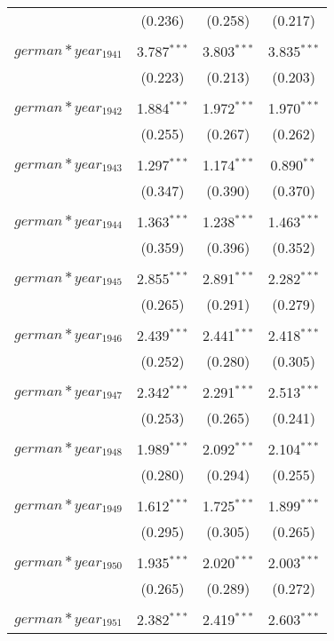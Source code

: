 \begin{table}[!htbp]
\begin{tabular}{@{\extracolsep{5pt}}lccc}
  & (0.236) & (0.258) & (0.217) \\ 
  & & & \\ 
 $german*year_1941$ & 3.787$^{***}$ & 3.803$^{***}$ & 3.835$^{***}$ \\ 
  & (0.223) & (0.213) & (0.203) \\ 
  & & & \\ 
 $german*year_1942$ & 1.884$^{***}$ & 1.972$^{***}$ & 1.970$^{***}$ \\ 
  & (0.255) & (0.267) & (0.262) \\ 
  & & & \\ 
 $german*year_1943$ & 1.297$^{***}$ & 1.174$^{***}$ & 0.890$^{**}$ \\ 
  & (0.347) & (0.390) & (0.370) \\ 
  & & & \\ 
 $german*year_1944$ & 1.363$^{***}$ & 1.238$^{***}$ & 1.463$^{***}$ \\ 
  & (0.359) & (0.396) & (0.352) \\ 
  & & & \\ 
 $german*year_1945$ & 2.855$^{***}$ & 2.891$^{***}$ & 2.282$^{***}$ \\ 
  & (0.265) & (0.291) & (0.279) \\ 
  & & & \\ 
 $german*year_1946$ & 2.439$^{***}$ & 2.441$^{***}$ & 2.418$^{***}$ \\ 
  & (0.252) & (0.280) & (0.305) \\ 
  & & & \\ 
 $german*year_1947$ & 2.342$^{***}$ & 2.291$^{***}$ & 2.513$^{***}$ \\ 
  & (0.253) & (0.265) & (0.241) \\ 
  & & & \\ 
 $german*year_1948$ & 1.989$^{***}$ & 2.092$^{***}$ & 2.104$^{***}$ \\ 
  & (0.280) & (0.294) & (0.255) \\ 
  & & & \\ 
 $german*year_1949$ & 1.612$^{***}$ & 1.725$^{***}$ & 1.899$^{***}$ \\ 
  & (0.295) & (0.305) & (0.265) \\ 
  & & & \\ 
 $german*year_1950$ & 1.935$^{***}$ & 2.020$^{***}$ & 2.003$^{***}$ \\ 
  & (0.265) & (0.289) & (0.272) \\ 
  & & & \\ 
 $german*year_1951$ & 2.382$^{***}$ & 2.419$^{***}$ & 2.603$^{***}$ \\ 

\end{tabular}
\end{table}
